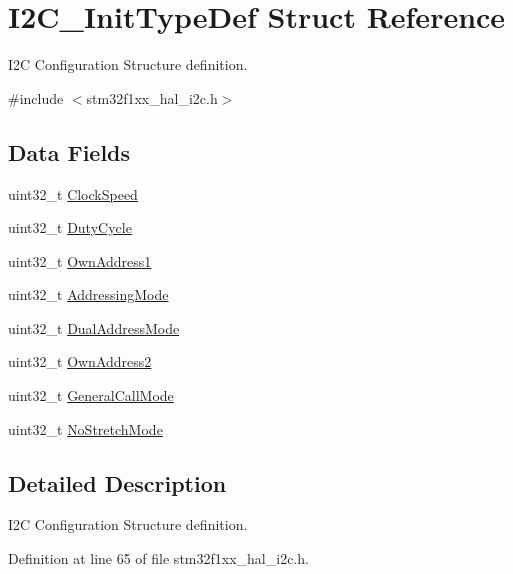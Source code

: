 \hypertarget{struct_i2_c___init_type_def}{}\section{I2\+C\+\_\+\+Init\+Type\+Def Struct Reference}
\label{struct_i2_c___init_type_def}


I2C Configuration Structure definition.  




{\ttfamily \#include $<$stm32f1xx\+\_\+hal\+\_\+i2c.\+h$>$}

\subsection*{Data Fields}
\begin{DoxyCompactItemize}
\item 
uint32\+\_\+t \hyperlink{struct_i2_c___init_type_def_a2e90d47d6a9a180f8c3126c70102d562}{Clock\+Speed}
\item 
uint32\+\_\+t \hyperlink{struct_i2_c___init_type_def_a762a4d954f3ccee6017e31fe902fb1c1}{Duty\+Cycle}
\item 
uint32\+\_\+t \hyperlink{struct_i2_c___init_type_def_a8abec5c168e27bf11b2808c1450bdeda}{Own\+Address1}
\item 
uint32\+\_\+t \hyperlink{struct_i2_c___init_type_def_aa7afcb44ef1f351763d7dc69ba0f4f8c}{Addressing\+Mode}
\item 
uint32\+\_\+t \hyperlink{struct_i2_c___init_type_def_aabb4e156aa4af60dfaf591419e9b1a07}{Dual\+Address\+Mode}
\item 
uint32\+\_\+t \hyperlink{struct_i2_c___init_type_def_a6300c7a7e1b7d5444226a1bd55744f53}{Own\+Address2}
\item 
uint32\+\_\+t \hyperlink{struct_i2_c___init_type_def_afc70f58c0935194064d720779fbf22b5}{General\+Call\+Mode}
\item 
uint32\+\_\+t \hyperlink{struct_i2_c___init_type_def_a47971fd08a9784eddaa3d83fb998030c}{No\+Stretch\+Mode}
\end{DoxyCompactItemize}


\subsection{Detailed Description}
I2C Configuration Structure definition. 

Definition at line 65 of file stm32f1xx\+\_\+hal\+\_\+i2c.\+h.



